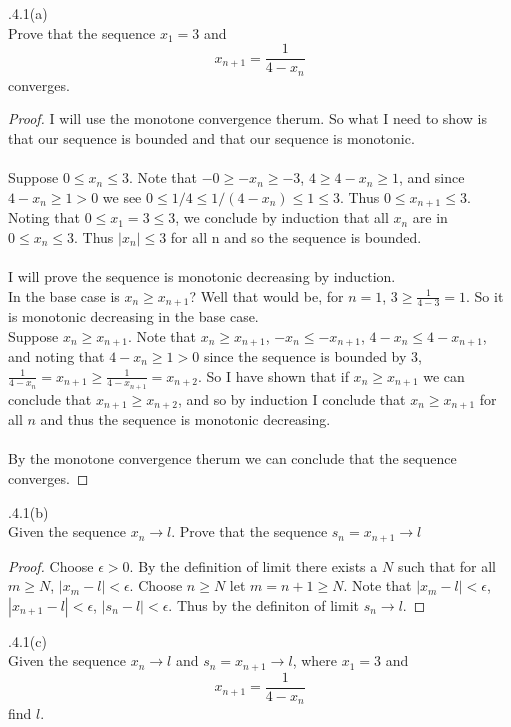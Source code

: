 \documentclass[12pt]{article}
\makeatletter
\theoremstyle{homework}
\newenvironment{exercise}[1]
{\def\@currentlabel{#1}\exercisecore}
{\endexercisecore}
\makeatother
\begin{document}
\begin{exercise}

2.4.1(a)\\
Prove that the sequence $x_1=3$ and
$$x_{n+1}=\frac{1}{4-x_n}
$$
converges.
\end{exercise}
\begin{proof}
I will use the monotone convergence therum.  So what I need to show is that our sequence is bounded and that our sequence is monotonic.\\\\
Suppose $0\leq x_n \leq 3$.  Note that $-0\geq -x_n \geq -3$, $4\geq 4-x_n \geq 1$, and since $4-x_n\geq 1>0$ we see $0\leq 1/4\leq1/( 4-x_n) \leq 1\leq 3$.  Thus $0\leq x_{n+1} \leq 3$.  Noting that $0\leq x_1=3\leq 3$, we conclude by induction that all $x_n$ are in $0\leq x_n \leq 3$.  Thus $|x_n|\leq 3$ for all n and so the sequence is bounded.\\\\
I will prove the sequence is monotonic decreasing by induction.\\
In the base case is $x_n\geq x_{n+1}$?  Well that would be, for $n=1$, $3\geq \frac{1}{4-3}=1$.  So it is monotonic decreasing in the base case.\\
Suppose $x_n\geq x_{n+1}$.  Note that $x_n\geq x_{n+1}$, $-x_n\leq -x_{n+1}$, $4-x_n\leq 4-x_{n+1}$, and noting that $4-x_n\geq1>0$ since the sequence is bounded by 3, $\frac{1}{4-x_n}=x_{n+1}\geq \frac{1}{4-x_{n+1}}=x_{n+2}$.  So I have shown that if $x_n\geq x_{n+1}$ we can conclude that $x_{n+1}\geq x_{n+2}$, and so by induction I conclude that $x_n\geq x_{n+1}$ for all $n$ and thus the sequence is monotonic decreasing.\\\\
By the monotone convergence therum we can conclude that the sequence converges.
\end{proof}
\begin{exercise}

2.4.1(b)\\
Given the sequence $x_n\rightarrow l$.  Prove that the sequence $s_n=x_{n+1}\rightarrow l$
\end{exercise}
\begin{proof}
Choose $\epsilon>0$.  By the definition of limit there exists a $N$ such that for all $m\geq N$, $|x_m-l|<\epsilon$.  Choose $n\geq N$ let $m=n+1\geq N$.  Note that $|x_m-l|<\epsilon$, $|x_{n+1}-l|<\epsilon$, $|s_n-l|<\epsilon$.  Thus by the definiton of limit $s_n\rightarrow l$.
\end{proof}
\begin{exercise}

2.4.1(c)\\
Given the sequence $x_n\rightarrow l$ and $s_n=x_{n+1}\rightarrow l$, where $x_1=3$ and
$$x_{n+1}=\frac{1}{4-x_n}
$$
find $l$.
\end{exercise}
\end{document}
